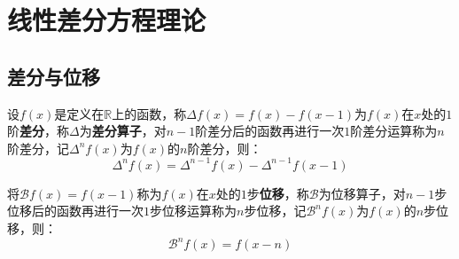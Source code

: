 \section{线性差分方程理论}

\subsection{差分与位移}
\begin{definition}
	设$f(x)$是定义在$\mathbb{R}$上的函数，称$\Delta f(x)=f(x)-f(x-1)$为$f(x)$在$x$处的$1$阶\textbf{差分}，称$\Delta$为\textbf{差分算子}，对$n-1$阶差分后的函数再进行一次$1$阶差分运算称为$n$阶差分，记$\Delta^nf(x)$为$f(x)$的$n$阶差分，则：
	\begin{equation*}
		\Delta^nf(x)=\Delta^{n-1}f(x)-\Delta^{n-1}f(x-1)
	\end{equation*}\par
	将$\mathcal{B}f(x)=f(x-1)$称为$f(x)$在$x$处的$1$步\textbf{位移}，称$\mathcal{B}$为位移算子，对$n-1$步位移后的函数再进行一次$1$步位移运算称为$n$步位移，记$\mathcal{B}^nf(x)$为$f(x)$的$n$步位移，则：
	\begin{equation*}
		\mathcal{B}^nf(x)=f(x-n)
	\end{equation*}
\end{definition}
